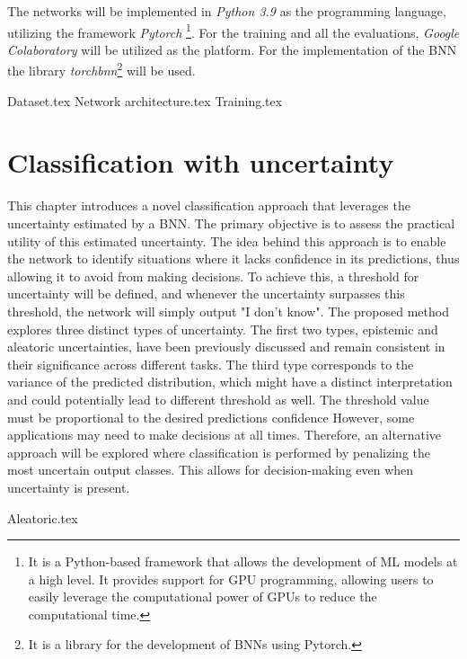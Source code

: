 \documentclass[
	a4paper,
	cleardoublepage=empty,
	headings=twolinechapter,
	numbers=autoenddot,
]{scrbook}
\begin{document}
	The networks will be implemented in \textit{Python 3.9} as the programming language, utilizing the framework \textit{Pytorch} \footnote{It is a Python-based framework that allows the development of ML models at a high level. It provides support for GPU programming, allowing users to easily leverage the computational power of GPUs to reduce the computational time.}\cite{NEURIPS2019_9015}. 
	For the training and all the evaluations, \textit{Google Colaboratory} will be utilized as the platform. For the implementation of the BNN the library \textit{torchbnn}\footnote{It is a library for the development of BNNs using Pytorch.}\cite{Torchbnn} will be used.
	
	{Dataset.tex}
	{Network architecture.tex}
	{Training.tex}
	
	\chapter{Classification with uncertainty}
	
	This chapter introduces a novel classification approach that leverages the uncertainty estimated by a BNN. The primary objective is to assess the practical utility of this estimated uncertainty. The idea behind this approach is to enable the network to identify situations where it lacks confidence in its predictions, thus allowing it to avoid from making decisions. To achieve this, a threshold for uncertainty will be defined, and whenever the uncertainty surpasses this threshold, the network will simply output "I don't know". 
	The proposed method explores three distinct types of uncertainty. The first two types, epistemic and aleatoric uncertainties, have been previously discussed and remain consistent in their significance across different tasks. The third type corresponds to the variance of the predicted distribution, which might have a distinct interpretation and could potentially lead to different threshold as well. The threshold value must be proportional to the desired predictions confidence
	However, some applications may need to make decisions at all times. Therefore, an alternative approach will be explored where classification is performed by penalizing the most uncertain output classes. This allows for decision-making even when uncertainty is present.
	
	{Aleatoric.tex}
	
	
	
	
	
	
\end{document}
